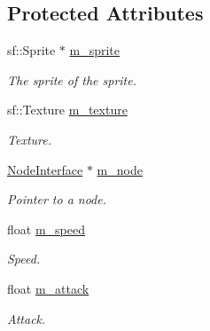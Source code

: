 \subsection*{Protected Attributes}
\begin{DoxyCompactItemize}
\item 
sf\+::\+Sprite $\ast$ \mbox{\hyperlink{class_sprite_interface_ad39fe3c5309c30a22ddfce60fa9f7c09}{m\+\_\+sprite}}
\begin{DoxyCompactList}\small\item\em The sprite of the sprite. \end{DoxyCompactList}\item 
\mbox{\label{class_sprite_interface_a6085987c42f63d186dfc69353dae76f1}} 
sf\+::\+Texture \mbox{\hyperlink{class_sprite_interface_a6085987c42f63d186dfc69353dae76f1}{m\+\_\+texture}}
\begin{DoxyCompactList}\small\item\em Texture. \end{DoxyCompactList}\item 
\mbox{\label{class_sprite_interface_a3535d0dbdd54673a67692aecac6c2052}} 
\mbox{\hyperlink{class_node_interface}{Node\+Interface}} $\ast$ \mbox{\hyperlink{class_sprite_interface_a3535d0dbdd54673a67692aecac6c2052}{m\+\_\+node}}
\begin{DoxyCompactList}\small\item\em Pointer to a node. \end{DoxyCompactList}\item 
\mbox{\label{class_sprite_interface_ab06d7faea880bcf73267dffb3fcb855c}} 
float \mbox{\hyperlink{class_sprite_interface_ab06d7faea880bcf73267dffb3fcb855c}{m\+\_\+speed}}
\begin{DoxyCompactList}\small\item\em Speed. \end{DoxyCompactList}\item 
\mbox{\label{class_sprite_interface_a43bacc6a76b45b80ef61daafbcc879b5}} 
float \mbox{\hyperlink{class_sprite_interface_a43bacc6a76b45b80ef61daafbcc879b5}{m\+\_\+attack}}
\begin{DoxyCompactList}\small\item\em Attack. \end{DoxyCompactList}\item 

\end{DoxyCompactItemize}
